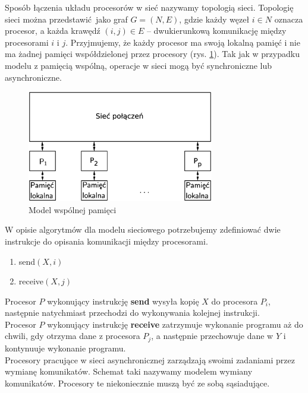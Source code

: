 Sposób łączenia układu procesorów w sieć nazywamy topologią sieci. Topologię sieci można przedstawić jako graf \(G=(N,E)\), gdzie każdy węzeł \(i\in N\) oznacza procesor, a każda krawędź \((i, j) \in E\) – dwukierunkową komunikację między procesorami \(i\) i \(j\). Przyjmujemy, że każdy procesor ma swoją lokalną pamięć i nie ma żadnej pamięci współdzielonej przez procesory (rys. \ref{fig:model_net}). Tak jak w przypadku modelu z pamięcią wspólną, operacje w sieci mogą być synchroniczne lub asynchroniczne.\\

\begin{figure}[b]
\centering
\includegraphics[width=22em]{images/Rys_net.eps}
\caption{Model wspólnej pamięci}
\label{fig:model_net}
\end{figure}

W opisie algorytmów dla modelu sieciowego potrzebujemy zdefiniować dwie instrukcje do opisania komunikacji między procesorami.
\begin{enumerate}
 \item send\((X,i)\)
 \item receive\((X,j)\)
\end{enumerate}

Procesor \(P\) wykonujący instrukcję \textbf{send} wysyła kopię \(X\) do procesora \(P_i\), następnie natychmiast przechodzi do wykonywania kolejnej instrukcji.\\
Procesor \(P\) wykonujący instrukcję \textbf{receive} zatrzymuje wykonanie programu aż do chwili, gdy otrzyma dane z procesora \(P_j\), a następnie przechowuje dane w \(Y\) i kontynuuje wykonanie programu.\\


Procesory pracujące w sieci asynchronicznej zarządzają swoimi zadaniami przez wymianę komunikatów. Schemat taki nazywamy modelem wymiany komunikatów. Procesory te niekoniecznie muszą być ze sobą sąsiadujące. 


